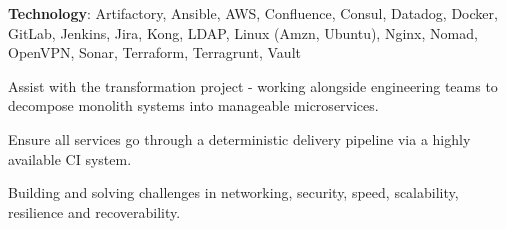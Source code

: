 \documentclass[]{cv}
\begin{document}
\begin{minipage}[t]{0.70\textwidth}
\begin{tightemize}
\end{tightemize}
\sectionsep
\sectionsep
{}
\sectionsep
\textbf{Technology}: Artifactory, Ansible, AWS, Confluence, Consul, Datadog, Docker, GitLab, Jenkins, Jira, Kong, LDAP, Linux (Amzn, Ubuntu), Nginx, Nomad, OpenVPN, Sonar, Terraform, Terragrunt, Vault
\sectionsep
\begin{tightemize}
\item Assist with the transformation project - working alongside engineering teams to decompose monolith systems into manageable microservices.
\item Ensure all services go through a deterministic delivery pipeline via a highly available CI system.
\item Building and solving challenges in networking, security, speed, scalability, resilience and recoverability.
\end{tightemize}
\sectionsep

\end{minipage}
\hfill
\end{document}
